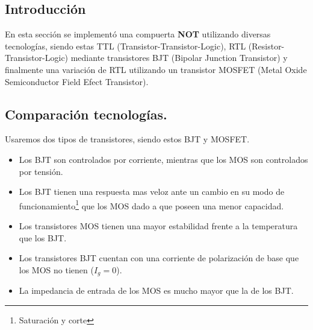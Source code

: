 %
%
%
%
%
%
%
%
%
%
%

\subsection{Introducción}
En esta sección se implementó una compuerta \textbf{NOT} utilizando diversas tecnologías, siendo estas TTL (Transistor-Transistor-Logic), RTL (Resistor-Transistor-Logic) mediante transistores BJT (Bipolar Junction Transistor) y finalmente una variación de RTL utilizando un transistor MOSFET (Metal Oxide Semiconductor Field Efect Transistor).
\subsection{Comparación tecnologías.}
Usaremos dos tipos de transistores, siendo estos BJT y MOSFET.
\begin{itemize}
\item Los BJT son controlados por corriente, mientras que los MOS son controlados por tensión.
\item Los BJT tienen una respuesta mas veloz ante un cambio en su modo de funcionamiento\footnote{Saturación y corte} que los MOS dado a que poseen una menor capacidad.
\item Los transistores MOS tienen una mayor estabilidad frente a la temperatura que los BJT.	
\item Los transistores BJT cuentan con una corriente de polarización de base que los MOS no tienen ($I_g =0$).
\item La impedancia de entrada de los MOS es mucho mayor que la de los BJT.
\end{itemize}

